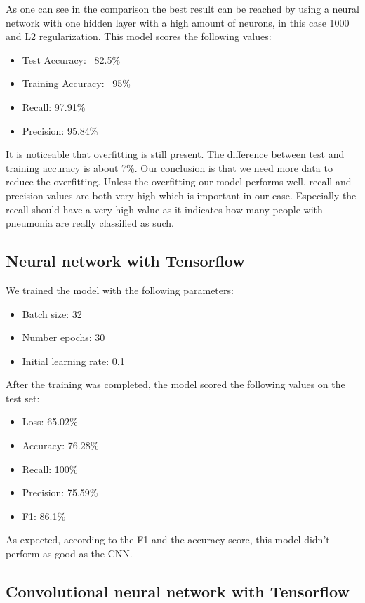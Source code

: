 \documentclass{article}
\begin{document}
As one can see in the comparison the best result can be reached by using a neural network 
with one hidden layer with a high amount of neurons, in this case 1000 and L2 regularization.
This model scores the following values:
\begin{itemize}
  \item Test Accuracy: ~82.5\%
  \item Training Accuracy: ~95\%
  \item Recall: 97.91\%
  \item Precision: 95.84\%
\end{itemize}

It is noticeable that overfitting is still present. The difference between test and training accuracy is about 7\%. 
Our conclusion is that we need more data to reduce the overfitting.
Unless the overfitting our model performs well, recall and precision values are both very high which is important in our case. 
Especially the recall should have a very high value as it indicates how many people with pneumonia are really classified as such.

\subsection{Neural network with Tensorflow}
\label{sec:neural_network_with_tensorflow}

We trained the model with the following parameters:
\begin{itemize}
  \item Batch size: 32
  \item Number epochs: 30
  \item Initial learning rate: 0.1
\end{itemize}

After the training was completed, the model scored the following values on the test set:

\begin{itemize}
  \item Loss: 65.02\%
  \item Accuracy: 76.28\%
  \item Recall: 100\%
  \item Precision: 75.59\%
  \item F1: 86.1\%
\end{itemize}

As expected, according to the F1 and the accuracy score, this model didn't perform as good as the CNN. 

\subsection{Convolutional neural network with Tensorflow}
\label{sec:cnn_with_tensorflow}
\end{document}
